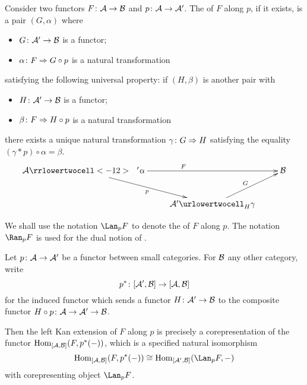   \begin{defn}
    Consider two functors $F\colon{\cal A}\to{\cal B}$ and $p\colon{\cal A}\to{\cal A}'$. The  of $F$ along $p$, if it exists, is a pair $(G,\alpha)$ where
    \begin{itemize}
      \item $G\colon{\cal A}'\to{\cal B}$ is a functor;
      \item $\alpha\colon F\Rightarrow G\circ p$ is a natural transformation
    \end{itemize}
    satisfying the following universal property:
    if $(H,\beta)$ is another pair with
    \begin{itemize}
      \item $H\colon{\cal A}'\to{\cal B}$ is a functor;
      \item $\beta\colon F\Rightarrow H\circ p$ is a natural transformation
    \end{itemize}
    there exists a unique natural transformation $\gamma\colon G\Rightarrow H$ satisfying the equality $(\gamma\ast p)\circ\alpha=\beta$.
      \begin{displaymath}
        \xymatrix{
          \Aa\ar[rr]^{F}\rrlowertwocell<-12>~{\dir{}}~'{\dir{}}^{}_{}{\alpha}\ar[dr]_{p}&&\Bb\\
          &\Aa'\ar[ur]^{G}\urlowertwocell^{}_{H}{\gamma}&
         }
      \end{displaymath}

    We shall use the notation $\Lan_pF$ to denote the  of $F$ along $p$. The notation $\Ran_pF$ is used for the dual notion of .
  \end{defn}

    Let $p\colon{\cal A}\to{\cal A}'$ be a functor between small categories. For ${\cal B}$ any other category, write
  \begin{equation*}
    p^{\ast}\colon[{\cal A}',{\cal B}]\to[{\cal A},{\cal B}]
  \end{equation*}
  for the induced functor which sends a functor $H\colon{\cal A}'\to{\cal B}$ to the composite functor $H\circ p\colon{\cal A}\to{\cal A}'\to{\cal B}$.

  Then the left Kan extension of $F$ along $p$ is precisely a corepresentation of the functor $\operatorname{Hom}_{[{\cal A},{\cal B}]}(F,p^{\ast}(-))$, which is a specified natural isomorphism
  \begin{equation*}
    \Hom_{[\Aa,\Bb]}(F,p^{\ast}(-))\cong\Hom_{[\Aa',\Bb]}(\Lan_pF,-)
  \end{equation*}
  with corepresenting object $\Lan_pF$.


